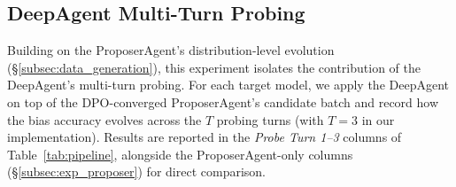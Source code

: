 \documentclass[lettersize,journal]{IEEEtran}
\begin{document}
\subsection{DeepAgent Multi-Turn Probing}


Building on the ProposerAgent's distribution-level evolution (\S\ref{subsec:data_generation}), this experiment isolates the contribution of the DeepAgent's multi-turn probing.
For each target model, we apply the DeepAgent on top of the DPO-converged ProposerAgent's candidate batch and record how the bias accuracy evolves across the $T$ probing turns (with $T = 3$ in our implementation).
Results are reported in the \emph{Probe Turn 1--3} columns of Table~\ref{tab:pipeline}, alongside the ProposerAgent-only columns (\S\ref{subsec:exp_proposer}) for direct comparison.
\end{document}
